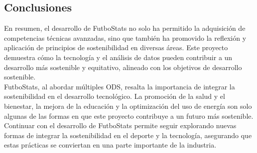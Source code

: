 \subsection{Conclusiones}
En resumen, el desarrollo de FutboStats no solo ha permitido la adquisición de competencias técnicas avanzadas, sino que también ha promovido la reflexión y aplicación de principios de sostenibilidad en diversas áreas. Este proyecto demuestra cómo la tecnología y el análisis de datos pueden contribuir a un desarrollo más sostenible y equitativo, alineado con los objetivos de desarrollo sostenible. \\
FutboStats, al abordar múltiples ODS, resalta la importancia de integrar la sostenibilidad en el desarrollo tecnológico. La promoción de la salud y el bienestar, la mejora de la educación y la optimización del uso de energía  son solo algunas de las formas en que este proyecto contribuye a un futuro más sostenible. \\
Continuar con el desarrollo de FutboStats permite seguir explorando nuevas formas de integrar la sostenibilidad en el deporte y la tecnología, asegurando que estas prácticas se conviertan en una parte importante de la industria.